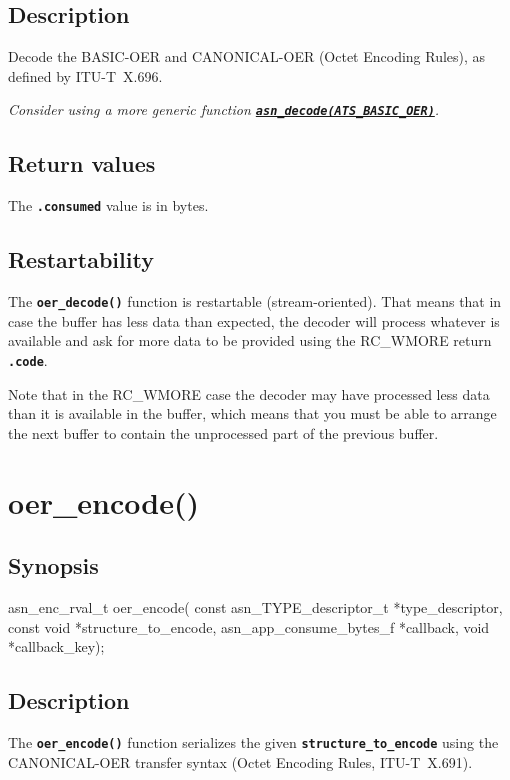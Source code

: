 \documentclass[english,oneside,12pt]{book}
\newcommand{\apisection}[2]{\clearpage\section{\label{#1}#2}}
\newcommand{\api}[2]{\hyperref[#1]{\code{#2}}}
\newcommand{\code}[1]{\texttt{\textbf{\lstinline{#1}}}}
\begin{document}
\subsection*{Description}

Decode the BASIC-OER and CANONICAL-OER (Octet Encoding Rules),
as defined by ITU-T~X.696.\newline

\noindent\emph{Consider using a more generic function \api{sec:asn_decode}{asn_decode(ATS_BASIC_OER)}.}

\subsection*{Return values}


The \code{.consumed} value is in bytes.

\subsection*{Restartability}

The \code{oer_decode()} function is restartable (stream-oriented).
That means that in case the buffer has less data than expected,
the decoder will process whatever is available and ask for more data
to be provided using the RC\_WMORE return \code{.code}.

Note that in the RC\_WMORE case the decoder may have processed less data than
it is available in the buffer, which means that you must be able to arrange
the next buffer to contain the unprocessed part of the previous buffer.

\apisection{sec:oer_encode}{oer\_encode()}

\subsection*{Synopsis}

\begin{signature}
asn_enc_rval_t oer_encode(
    const asn_TYPE_descriptor_t *type_descriptor,
    const void *structure_to_encode,
    asn_app_consume_bytes_f *callback,
    void *callback_key);
\end{signature}

\subsection*{Description}

The \code{oer_encode()} function serializes the given \code{structure_to_encode} using the CANONICAL-OER transfer syntax (Octet Encoding Rules, ITU-T~X.691).
\end{document}
